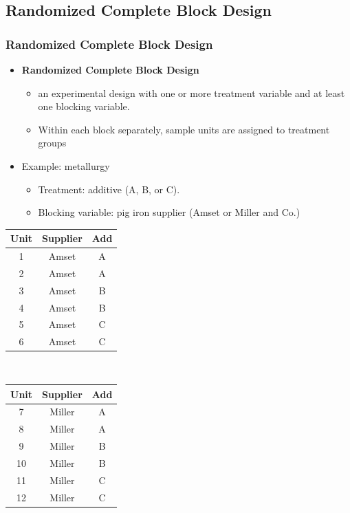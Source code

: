 \documentclass[handout]{beamer}\usepackage{graphicx, color}
\numberwithin{equation}{section}
\begin{document}
\subsection{Randomized Complete Block Design}


\begin{frame}
\frametitle{Randomized Complete Block Design} \small

\begin{itemize}
\item {\bf Randomized Complete Block Design} 
\begin{itemize}
\pause \item an experimental design with one or more treatment variable and at least one blocking variable.
\pause \item Within each block separately, sample units are assigned to treatment groups 
\end{itemize} 
\pause \item Example: metallurgy
\begin{itemize}
\item Treatment: additive (A, B, or C).
\pause \item Blocking variable: pig iron supplier (Amset or Miller and Co.)
\end{itemize} 
\end{itemize}
\scriptsize
\begin{center}
\begin{tabular}{c|c|c}
Unit & Supplier & Add\\ \hline
1 & Amset & A \\ 
2 & Amset & A \\ 
3 & Amset & B \\ 
4 & Amset & B \\ 
5 & Amset & C \\
6 & Amset & C \\
\end{tabular} $\quad$ \begin{tabular}{c|c|c}
Unit & Supplier & Add \\ \hline
7 & Miller & A \\ 
8 & Miller & A \\ 
9 & Miller & B \\ 
10 & Miller & B \\ 
11 & Miller & C \\ 
12 & Miller & C \\ 
\end{tabular}
\end{center}
\end{frame}
\end{document}
